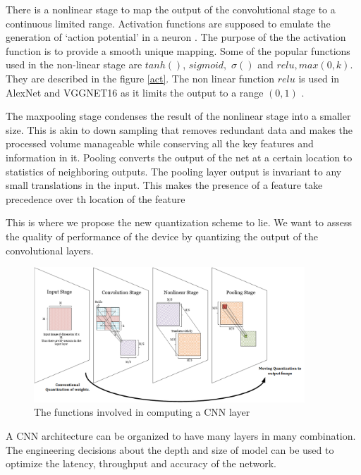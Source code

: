 \documentclass[conference]{IEEEtran}
\begin{document}
 There is a nonlinear stage to map the output of the convolutional stage to a continuous limited range. Activation functions are supposed to emulate the generation of `action potential' in a neuron \cite{glorot2011deep}. The purpose of the the activation function is to provide a smooth unique mapping.
 Some of the popular functions used in the non-linear stage are $tanh()$, $sigmoid,$ $\sigma()$ and $relu, max(0,k)$. They are described in the figure \ref{act}. The non linear function $relu$ is used in AlexNet and VGGNET16 as it limits the output to a range $(0,1)$ \cite{ krizhevsky2012imagenet}. 
 
 The maxpooling stage condenses the result of the nonlinear stage into a smaller size. This is akin to down sampling that removes redundant data and makes the processed volume manageable while conserving all the key features and information in it. Pooling converts the output of the net at a certain location to statistics of neighboring outputs. The pooling layer output is invariant to any small translations in the input. This makes the presence of a feature take precedence over th location of the feature \cite{Goodfellow-et-al-2016}
 
This is where we propose the new quantization scheme to lie. We want to assess the quality of performance of the device by quantizing the output of the convolutional layers. 


\begin{figure}[!ht]
\centering
\includegraphics[width=4in]{cnn_trans}
\caption{The functions involved in computing a CNN layer}
\label{cnn_ref}
\end{figure}

A CNN architecture can be organized to have many layers in many combination. The engineering decisions about the depth and size of model can be used to optimize the latency, throughput and accuracy of the network. 
\end{document}
